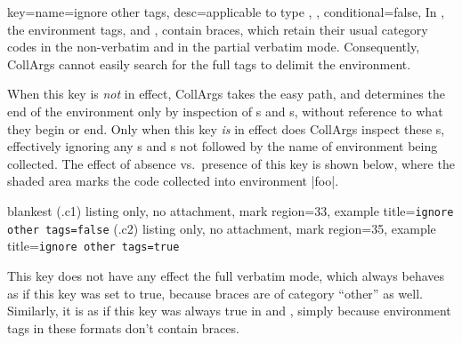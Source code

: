 \documentclass[a4paper,11pt]{article}
\begin{document}
\begin{doc}[
    pi=\docaux{cmd}{ifcollargsIgnoreOtherTags},
  ]{
    key={name=ignore other tags, desc={applicable to type ,{ }},
      conditional=false},
  }
  In , the environment tags,  and
  , contain braces, which retain their usual category codes
  in the non-verbatim and in the partial verbatim mode.  Consequently, CollArgs
  cannot easily search for the full tags to delimit the
  environment.

  When this key is \emph{not} in effect, CollArgs takes the easy path, and
  determines the end of the environment only by inspection of s and
    s, without reference to what  they begin or end.  Only
  when this key \emph{is} in effect does CollArgs inspect these s,
  effectively ignoring any s and s not followed by the name of
  environment being collected.  The effect of absence vs.\ presence of this key
  is shown below, where the shaded area marks the code collected into
  environment |foo|.

  \begin{tcboxedraster}{blankest}
    (.c1){
      listing only, no attachment, mark region={3}{3},
      example title=\texttt{ignore other tags=false}}
    (.c2){
      listing only, no attachment, mark region={3}{5},
      example title=\texttt{ignore other tags=true}}
  \end{tcboxedraster}

  This key does not have any effect the full verbatim mode, which always
  behaves as if this key was set to true, because braces are of category
  ``other'' as well.  Similarly, it is as if this key was always true in
   and , simply because environment tags in
  these formats don't contain braces.
\end{doc}
\end{document}
